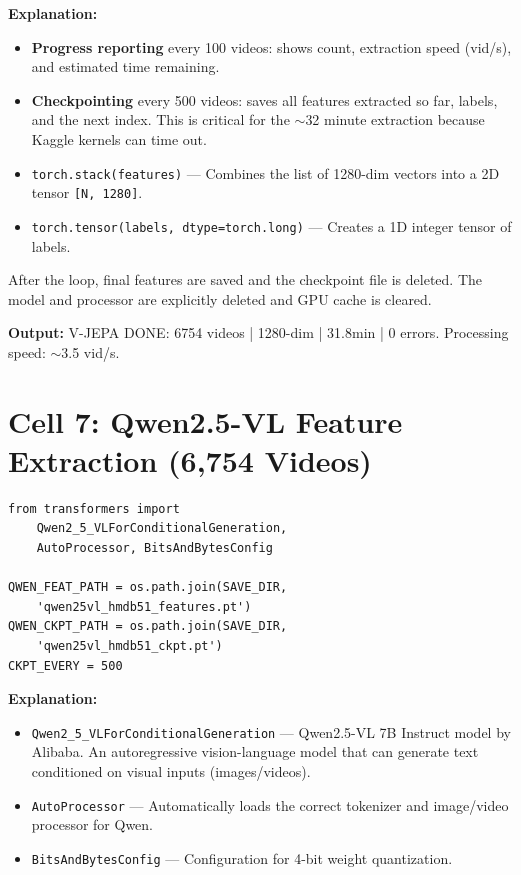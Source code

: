 \documentclass[a4paper, 12pt]{article}
\newenvironment{explanation}{%
  \par\smallskip
  \noindent\textcolor{blue!70!black}{\textbf{Explanation:}}\\
  \noindent
}{\par\medskip}
\begin{document}
\begin{explanation}
\begin{itemize}[nosep]
  \item \textbf{Progress reporting} every 100 videos: shows count, extraction speed (vid/s), and estimated time remaining.
  \item \textbf{Checkpointing} every 500 videos: saves all features extracted so far, labels, and the next index. This is critical for the $\sim$32 minute extraction because Kaggle kernels can time out.
  \item \texttt{torch.stack(features)} --- Combines the list of 1280-dim vectors into a 2D tensor \texttt{[N, 1280]}.
  \item \texttt{torch.tensor(labels, dtype=torch.long)} --- Creates a 1D integer tensor of labels.
\end{itemize}
\end{explanation}

After the loop, final features are saved and the checkpoint file is deleted. The model and processor are explicitly deleted and GPU cache is cleared.

\textbf{Output:} V-JEPA DONE: 6754 videos | 1280-dim | 31.8min | 0 errors. Processing speed: $\sim$3.5 vid/s.

\newpage
\section{Cell 7: Qwen2.5-VL Feature Extraction (6,754 Videos)}

\begin{lstlisting}
from transformers import
    Qwen2_5_VLForConditionalGeneration,
    AutoProcessor, BitsAndBytesConfig

QWEN_FEAT_PATH = os.path.join(SAVE_DIR,
    'qwen25vl_hmdb51_features.pt')
QWEN_CKPT_PATH = os.path.join(SAVE_DIR,
    'qwen25vl_hmdb51_ckpt.pt')
CKPT_EVERY = 500
\end{lstlisting}

\begin{explanation}
\begin{itemize}[nosep]
  \item \texttt{Qwen2\_5\_VLForConditionalGeneration} --- Qwen2.5-VL 7B Instruct model by Alibaba. An autoregressive vision-language model that can generate text conditioned on visual inputs (images/videos).
  \item \texttt{AutoProcessor} --- Automatically loads the correct tokenizer and image/video processor for Qwen.
  \item \texttt{BitsAndBytesConfig} --- Configuration for 4-bit weight quantization.
\end{itemize}
\end{explanation}
\end{document}
